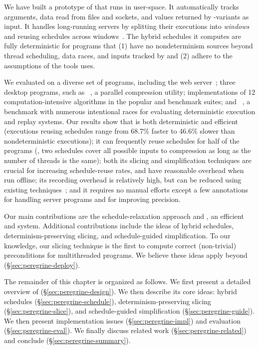 We have built a prototype of \peregrine that runs in user-space.
It automatically tracks 
arguments, data read from files and sockets, and values
returned by -variants as input.  It handles long-running servers by
splitting their executions into \emph{windows} and
reusing schedules across windows~\cite{cui:tern:osdi10}.
The hybrid schedules it computes are fully deterministic for programs that
(1) have no nondeterminism sources beyond thread scheduling, data races, and
inputs tracked by \peregrine and (2) adhere to the assumptions of the tools
\peregrine uses.

We evaluated \peregrine on a diverse set of \peregrinenprog programs, including the
\apache web server~\cite{apache}; three desktop programs, such as
\pbzip~\cite{pbzip2}, a parallel compression utility; implementations of
12 computation-intensive algorithms in the popular \splash and \parsec
benchmark suites; and \racey~\cite{racy-stress}, a benchmark with numerous
intentional races for evaluating deterministic execution and replay
systems.  Our results show that \peregrine is both deterministic and efficient
(executions reusing schedules range from 68.7\% faster to 46.6\% slower
than nondeterministic executions); it can frequently reuse schedules for
half of the programs (\eg, two schedules cover all possible inputs to
\pbzip compression as long as the number of threads is the same); both its
slicing and
simplification techniques are crucial for increasing schedule-reuse rates,
and have reasonable overhead when run offline; its recording overhead
is relatively high, but can be reduced using existing
techniques~\cite{idna:vee06}; and it requires no manual efforts except a
few annotations for handling server programs and for improving precision.

Our main contributions are the schedule-relaxation approach and \peregrine, an
 efficient \smt and \dmt system.  Additional contributions include
the ideas of hybrid schedules, determinism-preserving slicing, and
schedule-guided simplification.  To our knowledge, our slicing technique
is the first to compute correct (non-trivial) preconditions for
multithreaded programs.
We believe these ideas apply beyond \peregrine (\S\ref{sec:peregrine-deploy}).

The remainder of this chapter is organized as follows.  We first present a
detailed overview of \peregrine (\S\ref{sec:peregrine-design}).  We then describe its
core ideas: hybrid schedules (\S\ref{sec:peregrine-schedule}),
determinism-preserving slicing (\S\ref{sec:peregrine-slice}), and schedule-guided
simplification (\S\ref{sec:peregrine-guide}).  We then present implementation issues
(\S\ref{sec:peregrine-impl}) and evaluation (\S\ref{sec:peregrine-eval}).  We finally discuss
related work (\S\ref{sec:peregrine-related}) and conclude (\S\ref{sec:peregrine-summary}).
